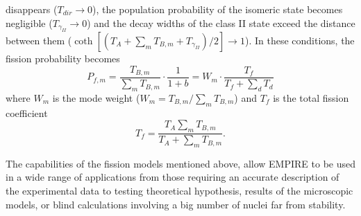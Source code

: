 \documentclass[twocolumn,amsmath,amssymb,10pt,groupedaddress,a4paper]{revtex4}
\begin{document}
disappears ($T_{dir}\rightarrow0$), the population probability of
the isomeric state becomes negligible ($T_{\gamma_{II}}\rightarrow0$)
and the decay widths of the class II state exceed the distance between
them ($\coth[(T_{A}+\sum_{m}T_{B,m}+T_{\gamma_{II}})/2]\rightarrow1$).
In these conditions, the fission probability becomes
\begin{equation}
P_{f,m}=\frac{T_{B,m}}{\sum_{m}T_{B,m}}\cdot\frac{1}{1+b}=W_{m}\cdot\frac{T_{f}}{T_{f}+\sum_{d}T_{d}}
\label{wm}
\end{equation}
\noindent where $W_{m}$ is the mode weight ($W_{m}=T_{B,m}/\sum_{m}T_{B,m}$)
and $T_{f}$ is the total fission coefficient
\begin{equation}
T_{f}=\frac{T_{A}\sum_{m}T_{B,m}}{T_{A}+\sum_{m}T_{B,m}}.
\end{equation}



The capabilities of the fission models mentioned above, allow EMPIRE to be used in
a wide range of applications from those requiring an accurate description of the experimental
data to testing theoretical hypothesis, results of the microscopic models, or blind calculations
involving a big number of nuclei far from stability.
\end{document}
